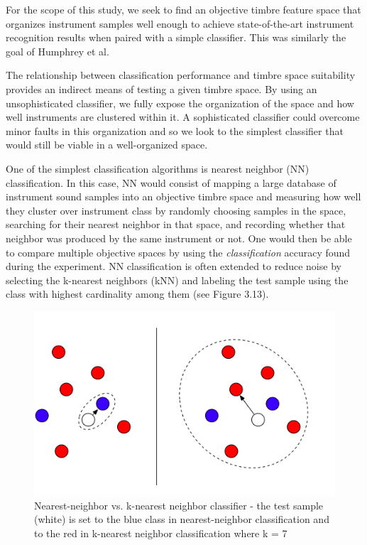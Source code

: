 \documentclass[12pt]{report} 	%
\numberwithin{figure}{chapter}
\numberwithin{table}{chapter}
\numberwithin{equation}{chapter}
\begin{document}
\begin{flushleft}
For the scope of this study, we seek to find an objective timbre feature space that organizes instrument samples well enough to achieve state-of-the-art instrument recognition results when paired with a simple classifier. This was similarly the goal of Humphrey et al.

The relationship between classification performance and timbre space suitability provides an indirect means of testing a given timbre space. By using an unsophisticated classifier, we fully expose the organization of the space and how well instruments are clustered within it. A sophisticated classifier could overcome minor faults in this organization and so we look to the simplest classifier that would still be viable in a well-organized space.

One of the simplest classification algorithms is nearest neighbor (NN) classification. In this case, NN would consist of mapping a large database of instrument sound samples into an objective timbre space and measuring how well they cluster over instrument class by randomly choosing samples in the space, searching for their nearest neighbor in that space, and recording whether that neighbor was produced by the same instrument or not. One would then be able to compare multiple objective spaces by using the \textit{classification} accuracy found during the experiment. NN classification is often extended to reduce noise by selecting the k-nearest neighbors (kNN) and labeling the test sample using the class with highest cardinality among them (see Figure 3.13).
\begin{figure}[h!]
\begin{center}
\includegraphics[scale=0.5]{NearestNeighbor}
\caption[Nearest-neighbor vs. k-nearest-neighbor classifier]{Nearest-neighbor vs. k-nearest neighbor classifier - the test sample (white) is set to the blue class in nearest-neighbor classification and to the red in k-nearest neighbor classification where k = 7}
\end{center}
\end{figure}


\end{flushleft}
\end{document}
